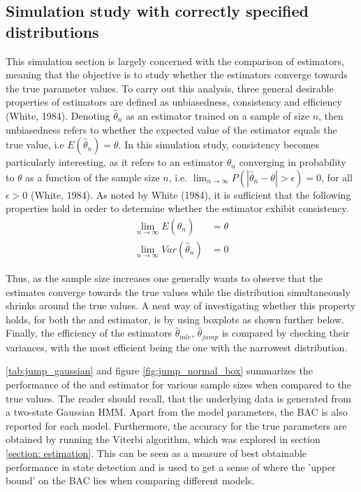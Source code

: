 \subsection{Simulation study with correctly specified distributions}
\label{section:simulation_corspeciffied}

This simulation section is largely concerned with the comparison of estimators, meaning that the objective is to study whether the estimators converge towards the true parameter values. To carry out this analysis, three general desirable properties of estimators are defined as unbiasedness, consistency and efficiency (White, 1984). Denoting $\hat\theta_n$ as an estimator trained on a sample of size $n$, then unbiasedness refers to whether the expected value of the estimator equals the true value, i.e $E(\hat\theta_n)=\theta$. In this simulation study, consistency becomes particularly interesting, as it refers to an estimator $\hat\theta_n$ converging in probability to $\theta$ as a function of the sample size $n$, i.e. $\lim_{n\to\infty}P(|\hat\theta_n - \theta|>\epsilon) = 0$, for all $\epsilon>0$ (White, 1984). As noted by White (1984), it is sufficient that the following properties hold in order to determine whether the estimator exhibit consistency.
\begin{align}
    \lim_{n\to\infty} E(\hat\theta_n) &= \theta \\
    \lim_{n\to\infty} Var(\hat\theta_n) &= 0
\label{eq:sim_consistency}
\end{align}

Thus, as the sample size increases one generally wants to observe that the estimates converge towards the true values while the distribution simultaneously shrinks around the true values. A neat way of investigating whether this property holds, for both the \mle and \jump estimator, is by using boxplots as shown further below. Finally, the efficiency of the estimators $\hat\theta_{mle}$, $\hat\theta_{jump}$ is compared by checking their variances, with the most efficient being the one with the narrowest distribution.

\cref{tab:jump_gaussian} and figure \ref{fig:jump_normal_box} summarizes the performance of the \mle and \jump estimator for various sample sizes when compared to the true values. The reader should recall, that the underlying data is generated from a two-state Gaussian HMM. Apart from the model parameters, the BAC is also reported for each model. Furthermore, the accuracy for the true parameters are obtained by running the Viterbi algorithm, which was explored in section \ref{section: estimation}. This can be seen as a measure of best obtainable performance in state detection and is used to get a sense of where the 'upper bound' on the BAC lies when comparing different models.

